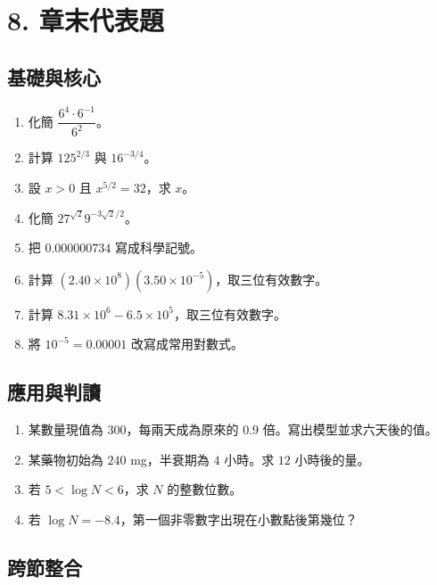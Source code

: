 \documentclass[11pt,a4paper]{article}
\providecommand{\tightlist}{%
  \setlength{\itemsep}{0pt}\setlength{\parskip}{0pt}}
\begin{document}
\section{8. 章末代表題}\label{ux7ae0ux672bux4ee3ux8868ux984c}

\subsection{基礎與核心}\label{ux57faux790eux8207ux6838ux5fc3}

\begin{enumerate}
\def\labelenumi{\arabic{enumi}.}
\tightlist
\item
  化簡 \(\dfrac{6^4\cdot6^{-1}}{6^2}\)。
\item
  計算 \(125^{2/3}\) 與 \(16^{-3/4}\)。
\item
  設 \(x>0\) 且 \(x^{5/2}=32\)，求 \(x\)。
\item
  化簡 \(27^{\sqrt{2}}9^{-3\sqrt{2}/2}\)。
\item
  把 \(0.000000734\) 寫成科學記號。
\item
  計算 \((2.40\times10^8)(3.50\times10^{-5})\)，取三位有效數字。
\item
  計算 \(8.31\times10^6-6.5\times10^5\)，取三位有效數字。
\item
  將 \(10^{-5}=0.00001\) 改寫成常用對數式。
\end{enumerate}

\subsection{應用與判讀}\label{ux61c9ux7528ux8207ux5224ux8b80}

\begin{enumerate}
\def\labelenumi{\arabic{enumi}.}
\setcounter{enumi}{8}
\tightlist
\item
  某數量現值為 \(300\)，每兩天成為原來的 \(0.9\) 倍。寫出模型並求六天後的值。
\item
  某藥物初始為 \(240\) mg，半衰期為 \(4\) 小時。求 \(12\) 小時後的量。
\item
  若 \(5<\log N<6\)，求 \(N\) 的整數位數。
\item
  若 \(\log N=-8.4\)，第一個非零數字出現在小數點後第幾位？
\end{enumerate}

\subsection{跨節整合}\label{ux8de8ux7bc0ux6574ux5408}
\end{document}
